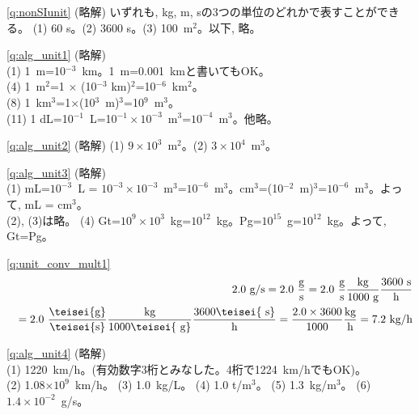
\ref{q:nonSIunit} (略解) いずれも, kg, m, sの3つの単位のどれかで表すことができる。
(1) 60 s。(2) 3600 s。(3) 100~m$^{2}$。以下, 略。\mv


\ref{q:alg_unit1} (略解)\\
(1) 1~m=10$^{-3}$~km。1~m=0.001~kmと書いてもOK。\\
(4) 1~m$^2$=1 $\times$ (10$^{-3}$ km)$^2$=10$^{-6}$~km$^2$。\\
(8) 1~km$^3$=1$\times$(10$^3$~m)$^3$=10$^{9}$~m$^3$。\\
(11) 1 dL=10$^{-1}$~L=10$^{-1}\times10^{-3}$~m$^3$=$10^{-4}$~m$^3$。他略。

\ref{q:alg_unit2} (略解) (1) $9\times 10^3$~m$^2$。(2) $3\times 10^4$~m$^3$。
\mv

\ref{q:alg_unit3} (略解) \\
(1) mL=$10^{-3}$~L = $10^{-3}\times10^{-3}$~m$^3$=$10^{-6}$~m$^3$。cm$^3$=(10$^{-2}$~m)$^3$=$10^{-6}$~m$^3$。よって, mL = cm$^3$。\\
(2), (3)は略。
(4) Gt=$10^9\times10^3$~kg=$10^{12}$~kg。Pg=$10^{15}$~g=$10^{12}$~kg。よって, Gt=Pg。\mv

\ref{q:unit_conv_mult1} 
\begin{eqnarray*}
&&2.0\,\,\text{g/s}=2.0\,\,\frac{\text{g}}{\text{s}}
=2.0\,\,\frac{\text{g}}{\text{s}}\frac{\text{kg}}{1000\text{ g}}\frac{3600\text{ s}}{\text{h}}\\
&&=2.0\,\,\frac{\teisei{\text{g}}}{\teisei{\text{s}}}\frac{\text{kg}}{1000 \teisei{\text{ g}}}\frac{3600\teisei{\text{ s}}}{\text{h}}
=\frac{2.0\times3600}{1000}\frac{\text{kg}}{\text{h}}
=7.2\text{ kg/h}
\end{eqnarray*}

\ref{q:alg_unit4} (略解) \\
(1) 1220~km/h。(有効数字3桁とみなした。4桁で1224~km/hでもOK)。\\
(2) 1.08$\times 10^9$~km/h。
(3) 1.0~kg/L。
(4) 1.0 t/m$^3$。
(5) 1.3~kg/m$^3$。
(6) $1.4\times 10^{-2}$~g/s。\mv

